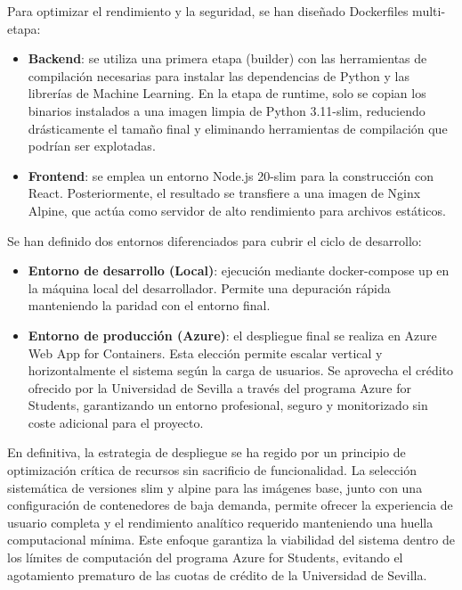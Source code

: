 Para optimizar el rendimiento y la seguridad, se han diseñado Dockerfiles
multi-etapa:
 
\begin{itemize}
\item \textbf{Backend}: se utiliza una primera etapa (builder) con las
herramientas de compilación necesarias para instalar las dependencias de
Python y las librerías de Machine Learning. En la etapa de runtime, solo se
copian los binarios instalados a una imagen limpia de Python 3.11-slim,
reduciendo drásticamente el tamaño final y eliminando herramientas de
compilación que podrían ser explotadas.
\item \textbf{Frontend}: se emplea un entorno Node.js 20-slim para la
construcción con React. Posteriormente, el resultado se transfiere a una imagen
de Nginx Alpine, que actúa como servidor de alto rendimiento para archivos
estáticos.
\end{itemize}
 
Se han definido dos entornos diferenciados para cubrir el ciclo de
desarrollo:
 
\begin{itemize}
\item \textbf{Entorno de desarrollo (Local)}: ejecución mediante docker-compose
up en la máquina local del desarrollador. Permite una depuración rápida
manteniendo la paridad con el entorno final.
\item \textbf{Entorno de producción (Azure)}: el despliegue final se realiza en
Azure Web App for Containers. Esta elección permite escalar vertical y
horizontalmente el sistema según la carga de usuarios. Se aprovecha el crédito
ofrecido por la Universidad de Sevilla a través del programa Azure for Students,
garantizando un entorno profesional, seguro y monitorizado sin coste adicional
para el proyecto.
\end{itemize}
 
En definitiva, la estrategia de despliegue se ha regido por un principio de
optimización crítica de recursos sin sacrificio de funcionalidad.
La selección sistemática de versiones slim y alpine para las imágenes base, junto con una
configuración de contenedores de baja demanda, permite ofrecer la experiencia de
usuario completa y el rendimiento analítico requerido manteniendo una huella
computacional mínima. Este enfoque garantiza la viabilidad del sistema dentro de
los límites de computación del programa Azure for Students, evitando el
agotamiento prematuro de las cuotas de crédito de la Universidad de Sevilla.